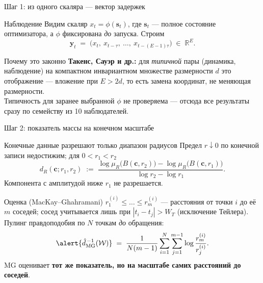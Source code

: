 \documentclass[aspectratio=169, 11pt]{beamer}
\newcommand{\gW}{\mathcal{W}}
\newcommand{\R}{\mathbb{R}}
\newcommand{\vc}{\mathbf{c}}
\newcommand{\vy}{\mathbf{y}}
\newcommand{\vs}{\mathbf{s}}
\newcommand{\dmg}{\hat{d}_{\mathrm{MG}}}
\newcommand{\WT}{W_T}
\begin{document}
\begin{frame}{Шаг 1: из одного скаляра --- вектор задержек}
    \begin{block}{Наблюдение}
        \small
        Видим скаляр $x_t = \phi(\vs_t)$, где $\vs_t$ --- полное состояние
        оптимизатора, а $\phi$ фиксирована \emph{до} запуска. Строим
        \[
          \vy_t \;=\; \bigl(x_t,\ x_{t-\tau},\ \dots,\ x_{t-(E-1)\tau}\bigr)
          \;\in\; \R^{E}.
        \]
    \end{block}

    \begin{block}{Почему это законно}
        \small
        \textbf{Такенс, Сауэр и др.:} для \emph{типичной} пары (динамика,
        наблюдение) на компактном инвариантном множестве размерности $d$ это
        отображение --- вложение при $E > 2d$, то есть замена координат, не
        меняющая размерности.\\[0.6mm]
        Типичность для заранее выбранной $\phi$ \alert{не проверяема} --- отсюда
        все результаты сразу по семейству из 10 наблюдателей.
    \end{block}
\end{frame}

\begin{frame}{Шаг 2: показатель массы на конечном масштабе}
    \begin{block}{Конечные данные разрешают только диапазон радиусов}
        \small
        Предел $r \downarrow 0$ по конечной записи недостижим; для $0<r_1<r_2$
        \[
          d_R(\vc; r_1, r_2) \;:=\;
          \frac{\log\mu_R\bigl(B(\vc,r_2)\bigr)
                - \log\mu_R\bigl(B(\vc,r_1)\bigr)}
               {\log r_2 - \log r_1}.
        \]
        Компонента с амплитудой ниже $r_1$ \alert{не разрешается}.
    \end{block}

    \begin{block}{Оценка (MacKay--Ghahramani)}
        \small
        $r^{(i)}_1 \le \dots \le r^{(i)}_m$ --- расстояния от точки $i$ до её $m$
        соседей; сосед учитывается лишь при $|t_i - t_j| > \WT$ (исключение
        Тейлера). Пулинг правдоподобия по $N$ точкам \emph{до} обращения:
        \[
          \alert{\dmg^{\,-1}(\gW)} \;=\; \frac{1}{N(m-1)}
          \sum_{i=1}^{N} \sum_{j=1}^{m-1} \log \frac{r^{(i)}_m}{r^{(i)}_j}.
        \]
        MG оценивает \textbf{тот же показатель, но на масштабе самих расстояний
        до соседей}.
    \end{block}
\end{frame}
\end{document}
